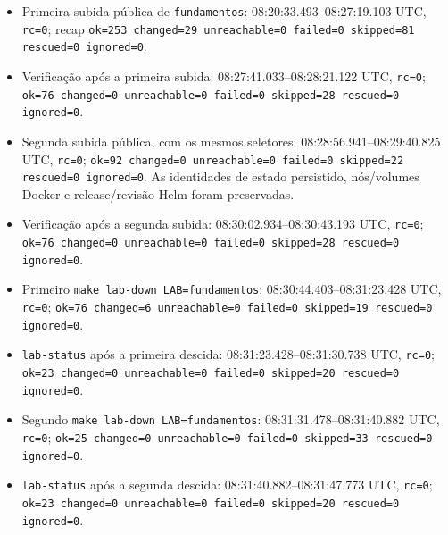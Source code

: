 \documentclass[12pt,openany,oneside,a4paper,chapter=TITLE,english,brazil]{abntex2}
\providecommand{\tightlist}{\setlength{\itemsep}{0pt}\setlength{\parskip}{0pt}}
\begin{document}
\begin{apendicesenv}
\begin{itemize}
\tightlist
\item
  Primeira subida pública de \texttt{fundamentos}: 08:20:33.493--08:27:19.103 UTC,
  \texttt{rc=\allowbreak{}0}; recap \texttt{ok=\allowbreak{}253 changed=\allowbreak{}29 unreachable=\allowbreak{}0 failed=\allowbreak{}0 skipped=\allowbreak{}81 rescued=\allowbreak{}0 ignored=\allowbreak{}0}.
\item
  Verificação após a primeira subida: 08:27:41.033--08:28:21.122 UTC, \texttt{rc=\allowbreak{}0};
  \texttt{ok=\allowbreak{}76 changed=\allowbreak{}0 unreachable=\allowbreak{}0 failed=\allowbreak{}0 skipped=\allowbreak{}28 rescued=\allowbreak{}0 ignored=\allowbreak{}0}.
\item
  Segunda subida pública, com os mesmos seletores: 08:28:56.941--08:29:40.825
  UTC, \texttt{rc=\allowbreak{}0}; \texttt{ok=\allowbreak{}92 changed=\allowbreak{}0 unreachable=\allowbreak{}0 failed=\allowbreak{}0 skipped=\allowbreak{}22 rescued=\allowbreak{}0 ignored=\allowbreak{}0}.
  As identidades de estado persistido, nós/volumes Docker e release/revisão Helm foram
  preservadas.
\item
  Verificação após a segunda subida: 08:30:02.934--08:30:43.193 UTC, \texttt{rc=\allowbreak{}0};
  \texttt{ok=\allowbreak{}76 changed=\allowbreak{}0 unreachable=\allowbreak{}0 failed=\allowbreak{}0 skipped=\allowbreak{}28 rescued=\allowbreak{}0 ignored=\allowbreak{}0}.
\item
  Primeiro \texttt{make lab-{}\allowbreak{}down LAB=\allowbreak{}fundamentos}: 08:30:44.403--08:31:23.428 UTC,
  \texttt{rc=\allowbreak{}0}; \texttt{ok=\allowbreak{}76 changed=\allowbreak{}6 unreachable=\allowbreak{}0 failed=\allowbreak{}0 skipped=\allowbreak{}19 rescued=\allowbreak{}0 ignored=\allowbreak{}0}.
\item
  \texttt{lab-{}\allowbreak{}status} após a primeira descida: 08:31:23.428--08:31:30.738 UTC, \texttt{rc=\allowbreak{}0};
  \texttt{ok=\allowbreak{}23 changed=\allowbreak{}0 unreachable=\allowbreak{}0 failed=\allowbreak{}0 skipped=\allowbreak{}20 rescued=\allowbreak{}0 ignored=\allowbreak{}0}.
\item
  Segundo \texttt{make lab-{}\allowbreak{}down LAB=\allowbreak{}fundamentos}: 08:31:31.478--08:31:40.882 UTC,
  \texttt{rc=\allowbreak{}0}; \texttt{ok=\allowbreak{}25 changed=\allowbreak{}0 unreachable=\allowbreak{}0 failed=\allowbreak{}0 skipped=\allowbreak{}33 rescued=\allowbreak{}0 ignored=\allowbreak{}0}.
\item
  \texttt{lab-{}\allowbreak{}status} após a segunda descida: 08:31:40.882--08:31:47.773 UTC, \texttt{rc=\allowbreak{}0};
  \texttt{ok=\allowbreak{}23 changed=\allowbreak{}0 unreachable=\allowbreak{}0 failed=\allowbreak{}0 skipped=\allowbreak{}20 rescued=\allowbreak{}0 ignored=\allowbreak{}0}.
\end{itemize}


\end{apendicesenv}
\end{document}
